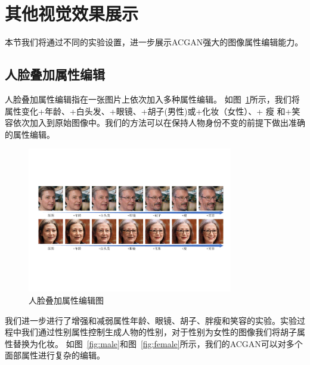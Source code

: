 \section{其他视觉效果展示}
本节我们将通过不同的实验设置，进一步展示ACGAN强大的图像属性编辑能力。

\subsection{人脸叠加属性编辑}
人脸叠加属性编辑指在一张图片上依次加入多种属性编辑。 如图~\ref{fig:multiAtt}所示，我们将属性变化+年龄、+白头发、+眼镜、+胡子(男性)或+化妆（女性）、+ 瘦
和+笑容依次加入到原始图像中。我们的方法可以在保持人物身份不变的前提下做出准确的属性编辑。


\begin{figure}[!t]
    \centering
    \includegraphics[width=0.8\textwidth]{figures/ACGAN/cover.pdf}
    \caption{人脸叠加属性编辑图}
    \label{fig:multiAtt}  
\end{figure}


我们进一步进行了增强和减弱属性年龄、眼镜、胡子、胖瘦和笑容的实验。实验过程中我们通过性别属性控制生成人物的性别，对于性别为女性的图像我们将胡子属性替换为化妆。 如图~\ref{fig:male}和图~\ref{fig:female}所示，我们的ACGAN可以对多个面部属性进行复杂的编辑。


